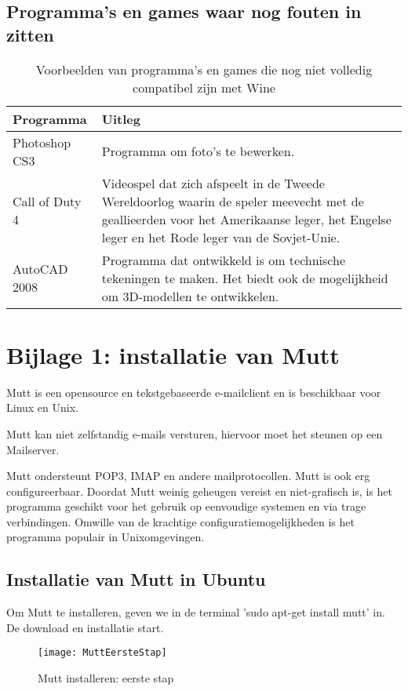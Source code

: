 \documentclass[12pt]{article}
\begin{document}
\subsection{Programma's en games waar nog fouten in zitten}
\begin{center}
\begin{table} [h]
\begin{tabular}{ | l | p{10cm} |}
	\hline
    Programma & Uitleg \\ \hline
   	 Photoshop CS3 & Programma om foto's te bewerken. \\ 			\hline
    Call of Duty 4 & Videospel dat zich afspeelt in de Tweede Wereldoorlog waarin de speler meevecht met de geallieerden voor het Amerikaanse leger, het Engelse leger en het Rode leger van de Sovjet-Unie. \\ \hline
    AutoCAD 2008 & Programma dat ontwikkeld is om technische tekeningen te maken. Het biedt ook de mogelijkheid om 3D-modellen te ontwikkelen.\\
    \hline
\end{tabular}
\caption{Voorbeelden van programma's en games die nog niet volledig compatibel zijn met Wine}
\end{table}
\end{center}
\newpage

\cite{Wikipedia}
\cite{exoplanetwebsite}
\newpage
\section{Bijlage 1: installatie van Mutt}
Mutt is een opensource en tekstgebaseerde e-mailclient en is beschikbaar voor Linux en Unix.

Mutt kan niet zelfstandig e-mails versturen, hiervoor moet het steunen op een Mailserver.

Mutt ondersteunt POP3, IMAP en andere mailprotocollen. Mutt is ook erg configureerbaar. Doordat Mutt weinig geheugen vereist en niet-grafisch is, is het programma geschikt voor het gebruik op eenvoudige systemen en via trage verbindingen. Omwille van de krachtige configuratiemogelijkheden is het programma populair in Unixomgevingen.

\subsection{Installatie van Mutt in Ubuntu}
Om Mutt te installeren, geven we in de terminal 'sudo apt-get install mutt' in. De download en installatie start.
\begin{figure} [h]
\begin{center}
	\texttt{[image: MuttEersteStap]}
\end{center}
	\caption{Mutt installeren: eerste stap}
\end{figure}
\end{document}
